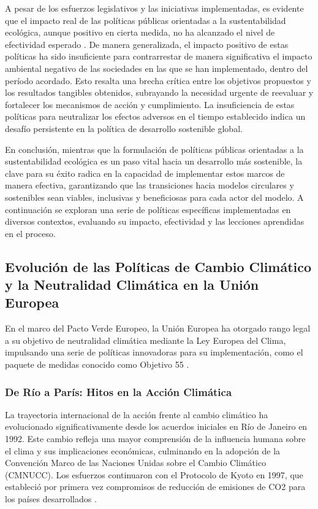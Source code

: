 \documentclass[main.tex]{subfiles}
\begin{document}
A pesar de los esfuerzos legislativos y las iniciativas implementadas, es evidente que el impacto real de las políticas públicas orientadas a la sustentabilidad ecológica, aunque positivo en cierta medida, no ha alcanzado el nivel de efectividad esperado \cite{gil2018objetivos, clima2022book}. De manera generalizada, el impacto positivo de estas políticas ha sido insuficiente para contrarrestar de manera significativa el impacto ambiental negativo de las sociedades en las que se han implementado, dentro del período acordado. Esto resalta una brecha crítica entre los objetivos propuestos y los resultados tangibles obtenidos, subrayando la necesidad urgente de reevaluar y fortalecer los mecanismos de acción y cumplimiento. La insuficiencia de estas políticas para neutralizar los efectos adversos en el tiempo establecido indica un desafío persistente en la política de desarrollo sostenible global.

En conclusión, mientras que la formulación de políticas públicas orientadas a la sustentabilidad ecológica es un paso vital hacia un desarrollo más sostenible, la clave para su éxito radica en la capacidad de implementar estos marcos de manera efectiva, garantizando que las transiciones hacia modelos circulares y sostenibles sean viables, inclusivas y beneficiosas para cada actor del modelo. A continuación se exploran una serie de políticas específicas implementadas en diversos contextos, evaluando su impacto, efectividad y las lecciones aprendidas en el proceso.

\subsection{Evolución de las Políticas de Cambio Climático y la Neutralidad Climática en la Unión Europea}

En el marco del Pacto Verde Europeo, la Unión Europea ha otorgado rango legal a su objetivo de neutralidad climática mediante la Ley Europea del Clima, impulsando una serie de políticas innovadoras para su implementación, como el paquete de medidas conocido como Objetivo 55 \cite{dormido2022cambio}.

\subsubsection{De Río a París: Hitos en la Acción Climática}
La trayectoria internacional de la acción frente al cambio climático ha evolucionado significativamente desde los acuerdos iniciales en Río de Janeiro en 1992. Este cambio refleja una mayor comprensión de la influencia humana sobre el clima y sus implicaciones económicas, culminando en la adopción de la Convención Marco de las Naciones Unidas sobre el Cambio Climático (CMNUCC). Los esfuerzos continuaron con el Protocolo de Kyoto en 1997, que estableció por primera vez compromisos de reducción de emisiones de CO2 para los países desarrollados \cite{dormido2022cambio}.
\end{document}
